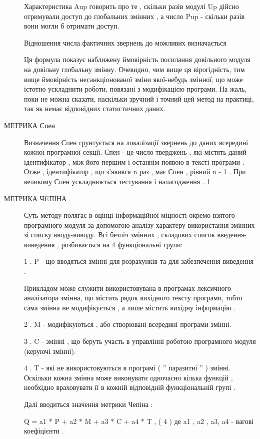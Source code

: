 \documentclass[oneside,final,14pt]{extreport}
\begin{document}
\begin{description}
Характеристика Aup говорить про те , скільки разів модулі Up дійсно отримували доступ до глобальних змінних , а число Pup - скільки разів вони могли б отримати доступ.

Відношення числа фактичних звернень до можливих визначається



Ця формула показує наближену ймовірність посилання довільного модуля на довільну глобальну змінну. Очевидно, чим вище ця вірогідність, тим вище ймовірність несанкціонованої зміни якої-небудь змінної, що може істотно ускладнити роботи, пов\dq язані з модифікацією програми. На жаль, поки не можна сказати, наскільки зручний і точний цей метод на практиці, так як немає відповідних статистичних даних.

\item[{МЕТРИКА Спен}] \leavevmode
Визначення Спен грунтується на локалізації звернень до даних всередині кожної програмної секції. Спен - це число тверджень , які містять даний ідентифікатор , між його першим і останнім появою в тексті програми . Отже , ідентифікатор , що з'явився n раз , має Спен , рівний n - 1 . При великому Спен ускладнюється тестування і налагодження .
1

\item[{МЕТРИКА ЧEПІНА .}] \leavevmode
Суть методу полягає в оцінці інформаційної міцності окремо взятого програмного модуля за допомогою аналізу характеру використання змінних зі списку вводу-виводу.
Всі безліч змінних , складових список введення-виведення , розбивається на 4 функціональні групи:

1 . P - що вводяться змінні для розрахунків та для забезпечення виведення .

Прикладом може служити використовувана в програмах лексичного аналізатора змінна, що містить рядок вихідного тексту програми, тобто сама змінна не модифікується , а лише містить вихідну інформацію .

2 . M - модифікуються , або створювані всередині програми змінні.

3 . C - змінні , що беруть участь в управлінні роботою програмного модуля (керуючі змінні).

4 . T - які не використовуються в програмі ( '' паразитні '' ) змінні. Оскільки кожна змінна може виконувати одночасно кілька функцій , необхідно враховувати її в кожній відповідній функціональній групі .

Далі вводиться значення метрики Чепіна :

Q = a1 * P + a2 * M + a3 * C + a4 * T , ( 4 )
де a1 , a2 , a3, a4 - вагові коефіцієнти .


\end{description}
\end{document}

